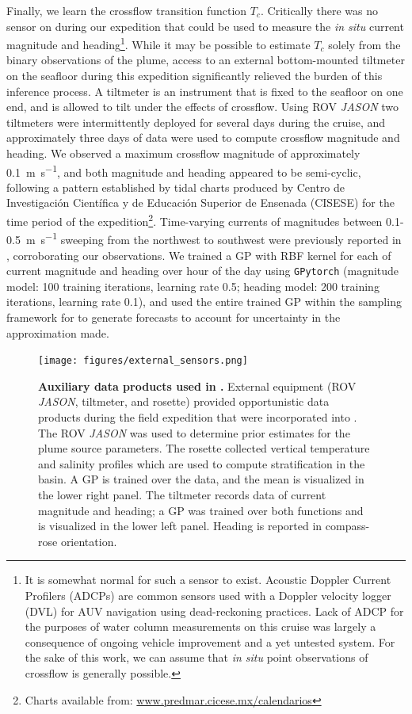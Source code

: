 Finally, we learn the crossflow transition function $T_c$. Critically there was no sensor on \Sentry during our expedition that could be used to measure the \emph{in situ} current magnitude and heading\footnote{It is somewhat normal for such a sensor to exist. Acoustic Doppler Current Profilers (ADCPs) are common sensors used with a Doppler velocity logger (DVL) for AUV navigation using dead-reckoning practices. Lack of ADCP for the purposes of water column measurements on this cruise was largely a consequence of ongoing vehicle improvement and a yet untested system. For the sake of this work, we can assume that \emph{in situ} point observations of crossflow is generally possible.}. While it may be possible to estimate $T_c$ solely from the binary observations of the plume, access to an external bottom-mounted tiltmeter on the seafloor during this expedition significantly relieved the burden of this inference process. A tiltmeter is an instrument that is fixed to the seafloor on one end, and is allowed to tilt under the effects of crossflow. Using ROV \emph{JASON} two tiltmeters were intermittently deployed for several days during the cruise, and approximately three days of data were used to compute crossflow magnitude and heading. We observed a maximum crossflow magnitude of approximately \SI{0.1}{\meter\per\second}, and both magnitude and heading appeared to be semi-cyclic, following a pattern established by tidal charts produced by Centro de Investigaci\'on Cient\'ifica y de Educaci\'on Superior de Ensenada (CISESE) for the time period of the expedition\footnote{Charts available from: \url{www.predmar.cicese.mx/calendarios}}. Time-varying currents of magnitudes between 0.1-\SI{0.5}{\meter\per\second} sweeping from the northwest to southwest were previously reported in \autocite{scholz2019shelf}, corroborating our observations. We trained a GP with RBF kernel for each of current magnitude and heading over hour of the day using \verb|GPytorch| (magnitude model: 100 training iterations, learning rate 0.5; heading model: 200 training iterations, learning rate 0.1), and used the entire trained GP within the sampling framework for \PHUMES to generate forecasts to account for uncertainty in the approximation made. 

\begin{figure}[h!]
    \centering
    \texttt{[image: figures/external\_sensors.png]}
    \caption[Auxiliary data products used in \PHUMES.]{\textbf{Auxiliary data products used in \PHUMES.} External equipment (ROV \emph{JASON}, tiltmeter, and rosette) provided opportunistic data products during the field expedition that were incorporated into \PHUMES. The ROV \emph{JASON} was used to determine prior estimates for the plume source parameters. The rosette collected vertical temperature and salinity profiles which are used to compute stratification in the basin. A GP is trained over the data, and the mean is visualized in the lower right panel. The tiltmeter records data of current magnitude and heading; a GP was trained over both functions and is visualized in the lower left panel. Heading is reported in compass-rose orientation.}
    \label{fig:ext_sensors}
\end{figure}


